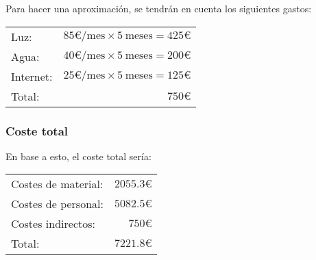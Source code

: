 Para hacer una aproximación, se tendrán en cuenta los siguientes gastos:

\begingroup
    \renewcommand{\arraystretch}{1.2}
    \begin{center}
        \begin{tabular}{lr}
            Luz: & $ 85\text{€/mes} \times 5\ \text{meses} = 425\text{€} $ \\
            Agua: & $ 40\text{€/mes} \times 5\ \text{meses} = 200\text{€} $ \\
            Internet: & $ 25\text{€/mes} \times 5\ \text{meses} = 125\text{€} $ \\
            \hline
            Total: & $ 750\text{€} $
        \end{tabular}
    \end{center}
\endgroup

\subsubsection{Coste total}

En base a esto, el coste total sería:

\begingroup
    \renewcommand{\arraystretch}{1.2}
    \begin{center}
        \begin{tabular}{lr}
            Costes de material: & $ 2055.3\text{€} $ \\
            Costes de personal: & $ 5082.5\text{€} $ \\
            Costes indirectos: & $ 750\text{€} $ \\
            \hline
            Total: & $ 7221.8\text{€} $
        \end{tabular}
    \end{center}
\endgroup
